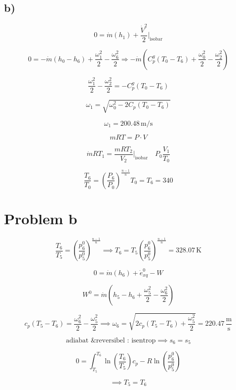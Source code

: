 

\subsection*{b)}

\[
0 = \dot{m}(h_1) + \frac{\dot{V}^2}{2} \bigg|_{\text{isobar}}
\]

\[
0 = -\dot{m}(h_0 - h_6) + \frac{\omega_1^2}{2} - \frac{\omega_6^2}{2} \Rightarrow -\dot{m}(C_p^g(T_0 - T_6) + \frac{\omega_0^2}{2} - \frac{\omega_2^2}{2})
\]

\[
\frac{\omega_1^2}{2} - \frac{\omega_2^2}{2} = -C_p^g(T_0 - T_6)
\]

\[
\omega_1 = \sqrt{\omega_0^2 - 2C_p(T_0 - T_6)}
\]

\[
\omega_1 = 200.48 \, \text{m/s}
\]

\[
mRT = P \cdot V
\]

\[
\dot{m}RT_1 = \frac{mR T_2}{V_2} \bigg|_{\text{isobar}} \quad P_0 \frac{V_1}{T_0}
\]

\[
\frac{T_6}{T_0} = \left( \frac{P_6}{P_0} \right)^{\frac{n-1}{n}} T_0 = T_6 = 340
\]

\section*{Problem b}

\[
\frac{T_6}{T_5} = \left( \frac{p_6^0}{p_5^0} \right)^{\frac{n-1}{n}} \implies T_6 = T_5 \left( \frac{p_6^0}{p_5^0} \right)^{\frac{n-1}{n}} = 328.07 \, \text{K}
\]

\[
0 = \dot{m}(h_6) + \dot{e}_{xq}^0 - W
\]

\[
W^0 = \dot{m} \left( h_5 - h_6 + \frac{\omega_5^2}{2} - \frac{\omega_6^2}{2} \right)
\]

\[
c_p (T_5 - T_6) = \frac{\omega_6^2}{2} - \frac{\omega_5^2}{2} \implies \omega_6 = \sqrt{2 c_p (T_5 - T_6) + \frac{\omega_5^2}{2}} = 220.47 \, \frac{\text{m}}{\text{s}}
\]

\[
\text{adiabat \& reversibel : isentrop} \implies s_6 = s_5
\]

\[
0 = \int_{T_5}^{T_6} \ln \left( \frac{T_6}{T_5} \right) c_p - R \ln \left( \frac{p_6^0}{p_5^0} \right)
\]

\[
\implies T_5 = T_6
\]